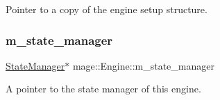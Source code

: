 Pointer to a copy of the engine setup structure. \hypertarget{classmage_1_1_engine_a7a0c463c67c3375b896809be9046113d}{}\label{classmage_1_1_engine_a7a0c463c67c3375b896809be9046113d} 
\subsubsection{\texorpdfstring{m\+\_\+state\+\_\+manager}{m\_state\_manager}}
{\footnotesize\ttfamily \hyperlink{classmage_1_1_state_manager}{State\+Manager}$\ast$ mage\+::\+Engine\+::m\+\_\+state\+\_\+manager\hspace{0.3cm}{\ttfamily [private]}}

A pointer to the state manager of this engine. 